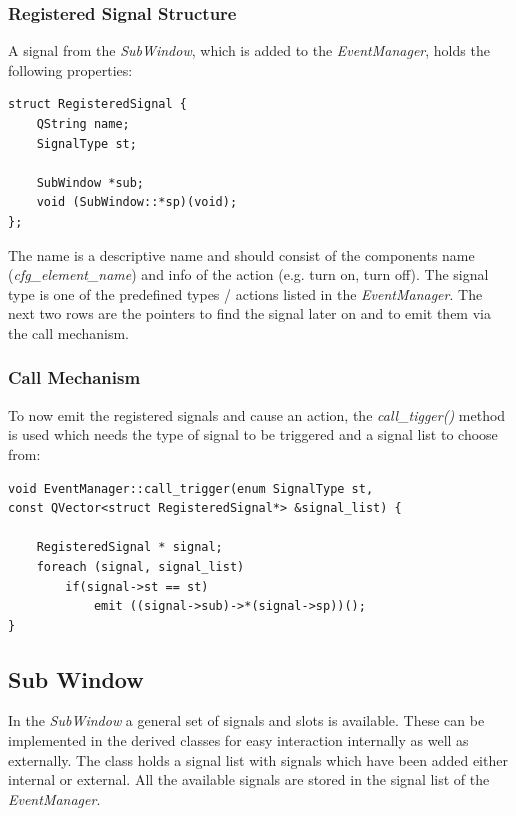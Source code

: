 \documentclass[10pt,a4paper]{article}
\begin{document}
		\subsubsection{Registered Signal Structure}

		A signal from the \textit{SubWindow}, which is added to the \textit{EventManager}, holds the following properties:
		
\begin{lstlisting}
struct RegisteredSignal {
	QString name;
	SignalType st;

	SubWindow *sub;
	void (SubWindow::*sp)(void);
};
\end{lstlisting}

			The name is a descriptive name and should consist of the components name (\textit{cfg\_element\_name}) and info of the action (e.g. turn on, turn off). The signal type is one of the predefined types / actions listed in the \textit{EventManager}. The next two rows are the pointers to find the signal later on and to emit them via the call mechanism.

		\subsubsection{Call Mechanism}
		
		To now emit the registered signals and cause an action, the \textit{call\_tigger()} method is used which needs the type of signal to be triggered and a signal list to choose from:
		
\begin{lstlisting}
void EventManager::call_trigger(enum SignalType st,
const QVector<struct RegisteredSignal*> &signal_list) {

    RegisteredSignal * signal;
    foreach (signal, signal_list)
        if(signal->st == st)
            emit ((signal->sub)->*(signal->sp))();
}
\end{lstlisting}

	\subsection{Sub Window}
	
	In the \textit{SubWindow} a general set of signals and slots is available. These can be implemented in the derived classes for easy interaction internally as well as externally. The class holds a signal list with signals which have been added either internal or external. All the available signals are stored in the signal list of the \textit{EventManager}.
\end{document}
